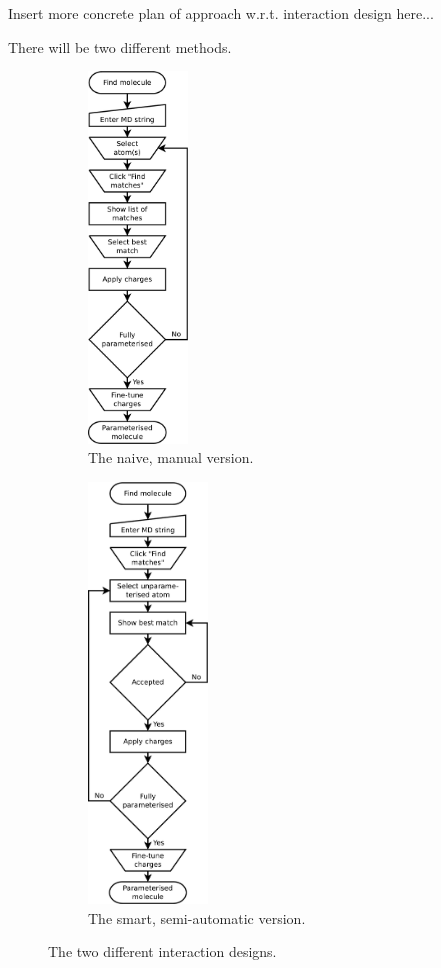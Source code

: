 Insert more concrete plan of approach w.r.t. interaction design here...

There will be two different methods. 
\begin{figure}[h!]
\centering
\begin{subfigure}[t]{0.47\textwidth}
\centering
\includegraphics[width=100px]{img/manual_id.pdf}
\caption{The naive, manual version.}
\end{subfigure}%
\qquad
\begin{subfigure}[t]{0.47\textwidth}
\centering
\includegraphics[width=120px]{img/semiauto_id.pdf}
\caption{The smart, semi-automatic version.}
\end{subfigure}
\caption{The two different interaction designs.}
\end{figure}

